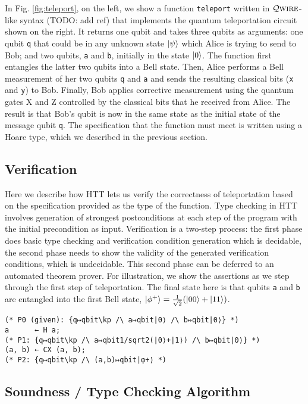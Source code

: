 \documentclass[acmsmall,nonacm,timestamp]{acmart}
\newcommand{\qwire}{\ensuremath{\mathcal{Q}\textsc{wire}}\xspace}
\begin{document}
In Fig. \ref{fig:teleport}, on the left, we show a function \lstinline{teleport} written in \qwire-like syntax (TODO: add ref) that implements the quantum teleportation circuit shown on the right. It returns one qubit and takes three qubits as arguments: one qubit \lstinline{q} that could be in any unknown state $\ket{\psi}$ which Alice is trying to send to Bob; and two qubits, \lstinline{a} and \lstinline{b}, initially in the state $\ket{0}$. The function first entangles the latter two qubits into a Bell state. Then, Alice performs a Bell measurement of her two qubits \lstinline{q} and \lstinline{a} and sends the resulting classical bits (\lstinline{x} and \lstinline{y}) to Bob. Finally, Bob applies corrective measurement using the quantum gates X and Z controlled by the classical bits that he received from Alice. The result is that Bob's qubit is now in the same state as the initial state of the message qubit \lstinline{q}. The specification that the function must meet is written using a Hoare type, which we described in the previous section.

\subsection{Verification}
Here we describe how HTT lets us verify the correctness of teleportation based on the specification provided as the type of the function. Type checking in HTT involves generation of strongest postconditions at each step of the program with the initial precondition as input. Verification is a two-step process: the first phase does basic type checking and verification condition generation which is decidable, the second phase needs to show the validity of the generated verification conditions, which is undecidable. This second phase can be deferred to an automated theorem prover. For illustration, we show the assertions as we step through the first step of teleportation. The final state here is that qubits \lstinline{a} and \lstinline{b} are entangled into the first Bell state, $\ket{\phi^+} = \frac{1}{\sqrt{2}}(\ket{00} + \ket{11})$.

\begin{lstlisting}
(* P0 (given): {q↦qbit\kp /\ a↦qbit|0⟩ /\ b↦qbit|0⟩} *)
a      ← H a;
(* P1: {q↦qbit\kp /\ a↦qbit1/sqrt2(|0⟩+|1⟩) /\ b↦qbit|0⟩} *)
(a, b) ← CX (a, b);
(* P2: {q↦qbit\kp /\ (a,b)↦qbit|φ+⟩ *)
\end{lstlisting}

\subsection{Soundness / Type Checking Algorithm}
\end{document}

